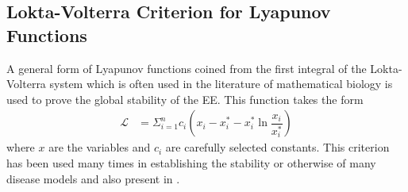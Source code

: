 \subsection{Lokta-Volterra Criterion for Lyapunov Functions}
A general form of Lyapunov functions coined from the first integral of the Lokta-Volterra system which is often used in the literature of mathematical biology is used to prove the global stability of the EE. This function takes the form  
\begin{align}
\mathscr{L} &= \Sigma_{i=1}^{n}c_{i}\left(x_{i} - x_{i}^{*} - x_{i}^{*}\ln\dfrac{x_{i}}{x^{*}_{i}}\right)\label{3.11}
\end{align}
where $ x $ are the variables and $ c_{i} $ are carefully selected constants. This criterion has been used many times in establishing the stability or otherwise of many disease models and also present in \cite{shuai2013global}.

